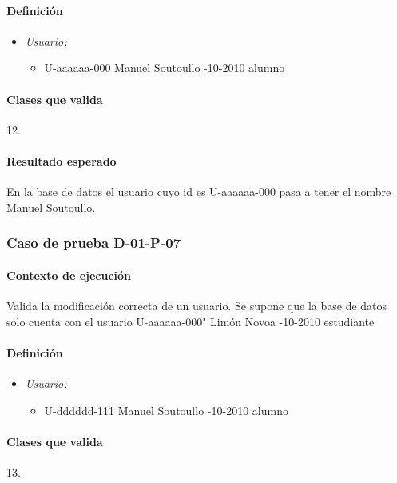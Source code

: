 \documentclass[10pt,a4paper]{article}
\begin{document}
				\paragraph{Definición}
				\begin{itemize}
					\item \textit{Usuario:}
					\begin{itemize}
						\item \textbar U-aaaaaa-000 \textbar Manuel \textbar Soutoullo -10-2010 \textbar alumno \textbar
					\end{itemize}
				\end{itemize}
				\paragraph{Clases que valida} 12.
				\paragraph{Resultado esperado} En la base de datos el usuario cuyo id es U-aaaaaa-000 pasa a tener el nombre Manuel Soutoullo.

			\subsubsection{Caso de prueba D-01-P-07}
			\paragraph{Contexto de ejecución} Valida la modificación correcta de un usuario. Se supone que la base de datos solo cuenta con el usuario \textbar U-aaaaaa-000" \textbar Limón Novoa -10-2010 \textbar estudiante \textbar
				\paragraph{Definición}
				\begin{itemize}
					\item \textit{Usuario:}
					\begin{itemize}
						\item \textbar U-dddddd-111 \textbar Manuel \textbar Soutoullo -10-2010 \textbar alumno \textbar
					\end{itemize}
				\end{itemize}
				\paragraph{Clases que valida} 13.
\end{document}
